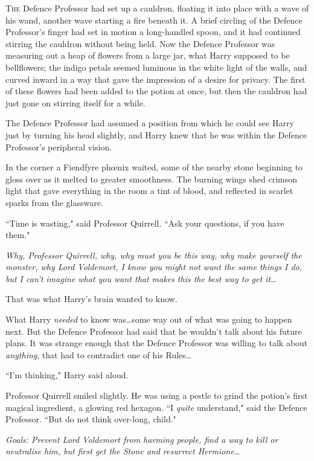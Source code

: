 
\lettrine{T}{he} Defence Professor had set up a cauldron, floating it into place with a wave of his wand, another wave starting a fire beneath it. A brief circling of the Defence Professor's finger had set in motion a long-handled spoon, and it had continued stirring the cauldron without being held. Now the Defence Professor was measuring out a heap of flowers from a large jar, what Harry supposed to be bellflowers; the indigo petals seemed luminous in the white light of the walls, and curved inward in a way that gave the impression of a desire for privacy. The first of these flowers had been added to the potion at once, but then the cauldron had just gone on stirring itself for a while.

The Defence Professor had assumed a position from which he could see Harry just by turning his head slightly, and Harry knew that he was within the Defence Professor's peripheral vision.

In the corner a Fiendfyre phœnix waited, some of the nearby stone beginning to gloss over as it melted to greater smoothness. The burning wings shed crimson light that gave everything in the room a tint of blood, and reflected in scarlet sparks from the glassware.

``Time is wasting," said Professor Quirrell. ``Ask your questions, if you have them."

\emph{Why, Professor Quirrell, why, why must you be this way, why make yourself the monster, why Lord Voldemort, I know you might not want the same things I do, but I can't imagine what you want that makes \emph{this} the best way to get it…}

That was what Harry's brain wanted to know.

What Harry \emph{needed} to know was…some way out of what was going to happen next. But the Defence Professor had said that he wouldn't talk about his future plans. It was strange enough that the Defence Professor was willing to talk about \emph{anything}, that had to contradict one of his Rules…

``I'm thinking," Harry said aloud.

Professor Quirrell smiled slightly. He was using a pestle to grind the potion's first magical ingredient, a glowing red hexagon. ``I \emph{quite} understand," said the Defence Professor. ``But do not think over-long, child."

\emph{Goals: Prevent Lord Voldemort from harming people, find a way to kill or neutralise him, but first get the Stone and resurrect Hermione…}

